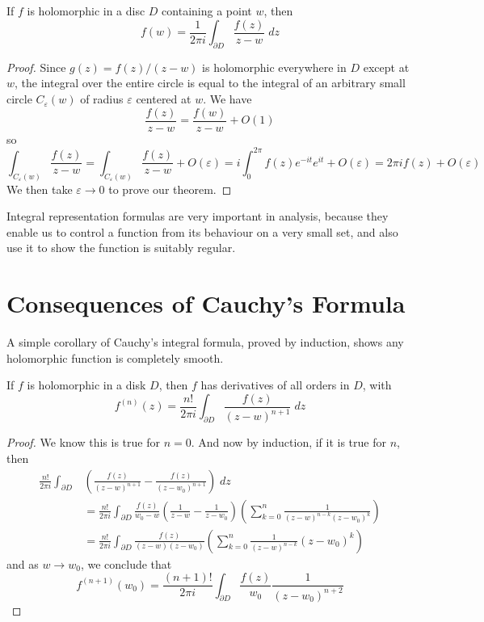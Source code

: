 \begin{theorem}
    If $f$ is holomorphic in a disc $D$ containing a point $w$, then
    \[ f(w) = \frac{1}{2 \pi i} \int_{\partial D} \frac{f(z)}{z - w}\; dz \]
\end{theorem}
\begin{proof}
    Since $g(z) = f(z)/(z-w)$ is holomorphic everywhere in $D$ except at $w$, the integral over the entire circle is equal to the integral of an arbitrary small circle $C_\varepsilon(w)$ of radius $\varepsilon$ centered at $w$. We have
    \[ \frac{f(z)}{z - w} = \frac{f(w)}{z - w} + O(1) \]
    so
    \[ \int_{C_\varepsilon(w)} \frac{f(z)}{z - w} = \int_{C_\varepsilon(w)} \frac{f(z)}{z-w} + O(\varepsilon) = i \int_0^{2\pi} f(z) e^{-it} e^{it} + O(\varepsilon) = 2 \pi i f(z) + O(\varepsilon) \]
    We then take $\varepsilon \to 0$ to prove our theorem.
\end{proof}

\begin{remark}
Integral representation formulas are very important in analysis, because they enable us to control a function from its behaviour on a very small set, and also use it to show the function is suitably regular.
\end{remark}

\section{Consequences of Cauchy's Formula}

A simple corollary of Cauchy's integral formula, proved by induction, shows any holomorphic function is completely smooth.

\begin{theorem}
    If $f$ is holomorphic in a disk $D$, then $f$ has derivatives of all orders in $D$, with
    \[ f^{(n)}(z) = \frac{n!}{2 \pi i} \int_{\partial D} \frac{f(z)}{(z - w)^{n+1}}\; dz \]
\end{theorem}
\begin{proof}
    We know this is true for $n = 0$. And now by induction, if it is true for $n$, then
    \begin{align*}
        \frac{n!}{2 \pi i} \int_{\partial D} & \left( \frac{f(z)}{(z - w)^{n+1}} - \frac{f(z)}{(z - w_0)^{n+1}} \right)\; dz\\
        &= \frac{n!}{2 \pi i} \int_{\partial D} \frac{f(z)}{w_0 - w} \left( \frac{1}{z - w} - \frac{1}{z - w_0} \right) \left( \sum_{k = 0}^n \frac{1}{(z - w)^{n-k}(z - w_0)^k} \right)\\
        &= \frac{n!}{2 \pi i} \int_{\partial D} \frac{f(z)}{(z - w)(z - w_0)} \left( \sum_{k = 0}^n \frac{1}{(z - w)^{n-k}}(z - w_0)^k \right)
    \end{align*}
    and as $w \to w_0$, we conclude that
    \[ f^{(n+1)}(w_0) = \frac{(n+1)!}{2 \pi i} \int_{\partial D} \frac{f(z)}{w_0} \frac{1}{(z - w_0)^{n+2}} \]
\end{proof}

